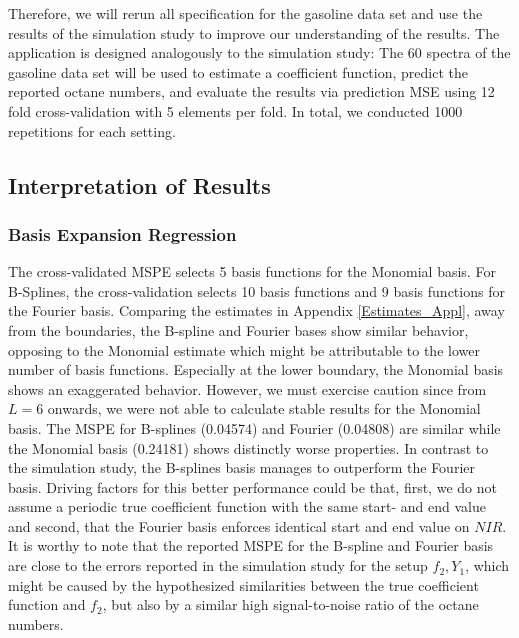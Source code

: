 \documentclass[11pt,twoside,a4paper]{article}
\begin{document}
		Therefore, we will rerun all specification for the gasoline data set and use the results of the simulation study to improve our understanding of the results. The application is designed analogously to the simulation study: The 60 spectra of the gasoline data set will be used to estimate a coefficient function, predict the reported octane numbers, and evaluate the results via prediction MSE using 12 fold cross-validation with 5 elements per fold. In total, we conducted 1000 repetitions for each setting.
		

		
	\subsection{Interpretation of Results}
		\subsubsection{Basis Expansion Regression}
		The cross-validated MSPE selects 5 basis functions for the Monomial basis. For B-Splines, the cross-validation selects 10 basis functions and 9 basis functions for the Fourier basis. Comparing the estimates in Appendix \ref{Estimates_Appl}, away from the boundaries, the B-spline and Fourier bases show similar behavior, opposing to the Monomial estimate which might be attributable to the lower number of basis functions. Especially at the lower boundary, the Monomial basis shows an exaggerated behavior. However, we must exercise caution since from $L=6$ onwards, we were not able to calculate stable results for the Monomial basis. The MSPE for B-splines (0.04574) and Fourier (0.04808) are similar while the Monomial basis (0.24181) shows distinctly worse properties. In contrast to the simulation study, the B-splines basis manages to outperform the Fourier basis. Driving factors for this better performance could be that, first, we do not assume a periodic true coefficient function with the same start- and end value and second, that the Fourier basis enforces identical start and end value on $NIR$. It is worthy to note that the reported MSPE for the B-spline and Fourier basis are close to the errors reported in the simulation study for the setup $f_2,Y_1$, which might be caused by the hypothesized similarities between the true coefficient function and $f_2$, but also by a similar high signal-to-noise ratio of the octane numbers. 
	
\end{document}
